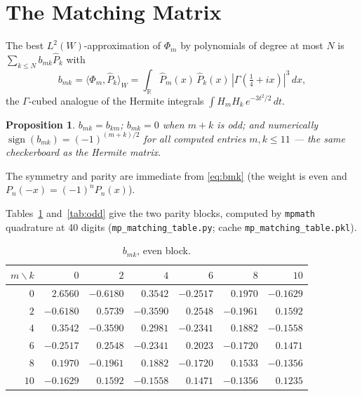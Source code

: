 \documentclass[11pt,a4paper]{article}
\theoremstyle{definition}
\theoremstyle{plain}
\newtheorem{proposition}[definition]{Proposition}
\newcommand{\R}{\mathbb{R}}
\begin{document}
\section{The Matching Matrix}

The best $L^2(W)$-approximation of $\Phi_m$ by polynomials of degree at
most $N$ is $\sum_{k \le N} b_{mk} \widehat{P}_k$ with
\begin{equation}\label{eq:bmk}
  b_{mk}
  = \langle \Phi_m, \widehat{P}_k \rangle_W
  = \int_\R \widehat{P}_m(x)\, \widehat{P}_k(x)\,
    |\Gamma(\tfrac14 + ix)|^3\, dx,
\end{equation}
the $\Gamma$-cubed analogue of the Hermite integrals
$\int H_m H_k\, e^{-3t^2/2}\, dt$.

\begin{proposition}
$b_{mk} = b_{km}$; $b_{mk} = 0$ when $m + k$ is odd; and numerically
$\operatorname{sign}(b_{mk}) = (-1)^{(m+k)/2}$ for all computed entries
$m, k \le 11$ --- the same checkerboard as the Hermite matrix.
\end{proposition}

The symmetry and parity are immediate from \eqref{eq:bmk} (the weight is
even and $P_n(-x) = (-1)^n P_n(x)$).

Tables~\ref{tab:even} and~\ref{tab:odd} give the two parity blocks,
computed by \texttt{mpmath} quadrature at 40 digits
(\texttt{mp\_matching\_table.py}; cache
\texttt{mp\_matching\_table.pkl}).

\begin{table}[ht]
\centering
\caption{$b_{mk}$, even block.}
\label{tab:even}
\small
\begin{tabular}{r|rrrrrr}
\toprule
$m \backslash k$ & $0$ & $2$ & $4$ & $6$ & $8$ & $10$ \\
\midrule
$0$  & $2.6560$  & $-0.6180$ & $0.3542$  & $-0.2517$ & $0.1970$  & $-0.1629$ \\
$2$  & $-0.6180$ & $0.5739$  & $-0.3590$ & $0.2548$  & $-0.1961$ & $0.1592$  \\
$4$  & $0.3542$  & $-0.3590$ & $0.2981$  & $-0.2341$ & $0.1882$  & $-0.1558$ \\
$6$  & $-0.2517$ & $0.2548$  & $-0.2341$ & $0.2023$  & $-0.1720$ & $0.1471$  \\
$8$  & $0.1970$  & $-0.1961$ & $0.1882$  & $-0.1720$ & $0.1533$  & $-0.1356$ \\
$10$ & $-0.1629$ & $0.1592$  & $-0.1558$ & $0.1471$  & $-0.1356$ & $0.1235$  \\
\bottomrule
\end{tabular}
\end{table}
\end{document}
